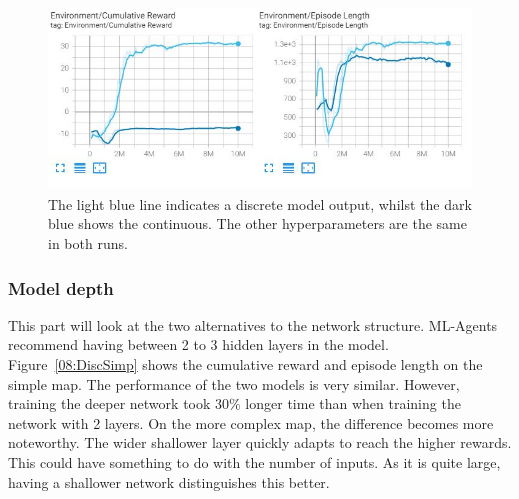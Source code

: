 \begin{figure}[H]
    \includegraphics[width=1\textwidth]{08_Results/ML-agent results/DiscreteVContinous1.JPG}
    \caption[Discrete vs Continuous]{The light blue line indicates a discrete model output, whilst the dark blue shows the continuous. The other hyperparameters are the same in both runs.} \label{08:DiscreteVsCont}
\end{figure}


\subsubsection{Model depth}
This part will look at the two alternatives to the network structure. ML-Agents recommend having between 2 to 3 hidden layers in the model. Figure~\ref{08:DiscSimp} shows the cumulative reward and episode length on the simple map. The performance of the two models is very similar. However, training the deeper network took 30\% longer time than when training the network with 2 layers. On the more complex map, the difference becomes more noteworthy. The wider shallower layer quickly adapts to reach the higher rewards. This could have something to do with the number of inputs. As it is quite large, having a shallower network distinguishes this better. 

